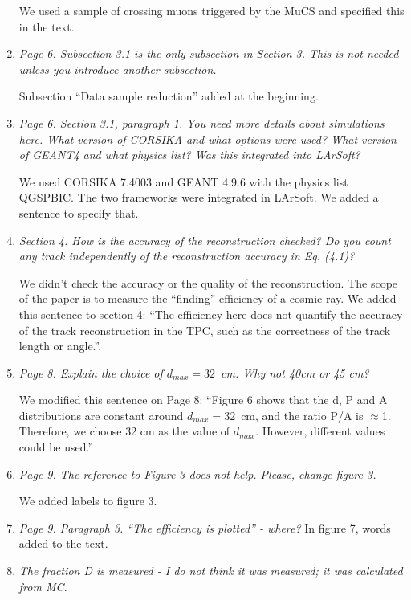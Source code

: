 \documentclass[review,number,sort&compress]{article}
\begin{document}
\begin{enumerate}
We used a sample of crossing muons triggered by the MuCS and specified this in the text.

\item \emph{Page 6.
Subsection 3.1 is the only subsection in Section 3. This is not needed unless you introduce another subsection.}

Subsection ``Data sample reduction'' added at the beginning.

\item \emph{Page 6. Section 3.1, paragraph 1.
You need more details about simulations here.
What version of CORSIKA and what options were used?
What version of GEANT4 and what physics list? Was this integrated into LArSoft?}


We used CORSIKA 7.4003 and GEANT 4.9.6 with the physics list QGSP\textunderscore BIC. The two frameworks were integrated in LArSoft. We added a sentence to specify that.

\item \emph{Section 4.
How is the accuracy of the reconstruction checked? Do you count any track independently of the reconstruction accuracy in Eq. (4.1)?}

We didn't check the accuracy or the quality of the reconstruction. The scope of the paper is to measure the ``finding'' efficiency of a cosmic ray. We added this sentence to section 4: ``The efficiency here does not quantify the accuracy of the track reconstruction in the TPC, such as the correctness of the track length or angle.''.

\item \emph{Page 8.
Explain the choice of $d_{max} = 32$~cm. Why not 40cm or 45 cm?}

We modified this sentence on Page 8: ``Figure 6 shows that the d, P and A distributions are constant around $d_{max} = 32$~cm, and the ratio P/A
is $\approx$1. Therefore, we choose 32 cm as the value of $d_{max}$. However, different values could be used.''

\item \emph{Page 9. The reference to Figure 3 does not help. Please, change figure 3.}

We added labels to figure 3.

\item \emph{Page 9. Paragraph 3.
``The efficiency is plotted'' - where?}
In figure 7, words added to the text.

\item \emph{The fraction D is measured - I do not think it was measured; it was calculated from MC.}


\end{enumerate}
\end{document}

